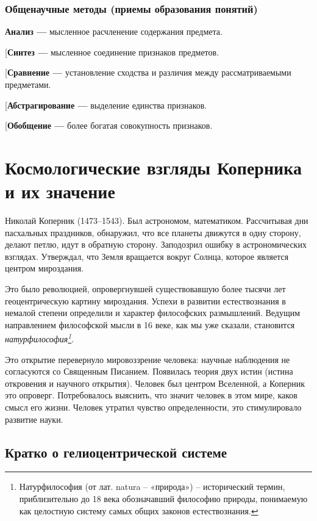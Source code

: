\documentclass[a4paper, 14pt]{extreport}
\begin{document}
\subsubsection{Общенаучные методы (приемы образования понятий)}

\textbf{Анализ ---}
мысленное расчленение содержания предмета.
\item[\textbf{Синтез ---}
мысленное соединение признаков предметов.
\item[\textbf{Сравнение ---}
установление сходства и различия между рассматриваемыми предметами.
\item[\textbf{Абстрагирование ---}
выделение единства признаков.
\item[\textbf{Обобщение ---}
более богатая совокупность признаков.


\section{Космологические взгляды Коперника и их значение}

Николай Коперник (1473--1543). Был астрономом, математиком. Рассчитывая
дни пасхальных праздников, обнаружил, что все планеты движутся в одну
сторону, делают петлю, идут в обратную сторону. Заподозрил ошибку в
астрономических взглядах. Утверждал, что Земля вращается вокруг Солнца,
которое является центром мироздания.

Это было революцией, опровергнувшей существовавшую более тысячи лет
геоцентрическую картину мироздания. Успехи в развитии естествознания в
немалой степени определили и характер философских размышлений. Ведущим
направлением философской мысли в 16 веке, как мы уже сказали, становится
\emph{натурфилософия\footnote{Натурфилософия (от лат. natura --
  «природа») -- исторический термин, приблизительно до 18 века
  обозначавший философию природы, понимаемую как целостную систему самых
  общих законов естествознания.}}.

Это открытие перевернуло мировоззрение человека: научные наблюдения не
согласуются со Священным Писанием. Появилась теория двух истин (истина
откровения и научного открытия). Человек был центром Вселенной, а
Коперник это опроверг. Потребовалось выяснить, что значит человек в этом
мире, каков смысл его жизни. Человек утратил чувство определенности, это
стимулировало развитие науки.

\subsection{Кратко о гелиоцентрической системе}
\end{document}
